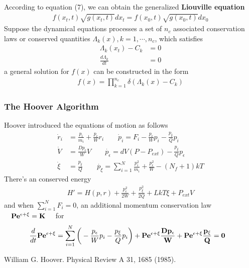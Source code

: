 \documentclass{beamer}
\begin{document}
\begin{frame}
\fontsize{9pt}{10pt}\selectfont
According to equation (7), we can obtain the generalized \textbf{Liouville equation}
\begin{align}
f(x_t,t)\sqrt{g(x_t,t)}dx_t=f(x_0,t)\sqrt{g(x_0,t)}dx_0
\end{align}
Suppose the dynamical equations processes a set of $n_c$ associated conservation laws or conserved quantities $\Lambda_k(x),k=1,\cdots,n_c$, which satisfies
\begin{align*}
\Lambda_k(x_t)-C_k&=0\\
\frac{d\Lambda_k}{dt}&=0
\end{align*}
a general solution for $f(x)$ can be constructed in the form
\begin{align}
f(x)=\prod^{n_c}_{k=1}\delta(\Lambda_k(x)-C_k)
\end{align}
\end{frame}
\begin{frame}
\frametitle{The Hoover Algorithm}
\fontsize{9pt}{10pt}\selectfont
Hoover introduced the equations of motion as follows
\begin{align}
\dot{r}_i&=\frac{p_i}{m_i}+\frac{p_{\epsilon}}{W}r_i\qquad 
\dot{p}_i=F_i-\frac{p_{\epsilon}}{W}p_i-\frac{p_{\xi}}{Q}p_i\nonumber\\
\dot{V}&=\frac{Dp_{\epsilon}}{W}V\qquad
\dot{p_{\epsilon}}=dV(P-P_{ext})-\frac{p_{\xi}}{Q}p_{\epsilon}\\
\dot{\xi}&=\frac{p_{\xi}}{Q}\qquad
\dot{p_{\xi}}=\sum^N_{i=1}\frac{p_i^2}{m_i}+\frac{p_{\epsilon}^2}{W}-(N_f+1)kT\nonumber
\end{align}
There's an conserved energy
\begin{align}
H'=H(p,r)+\frac{p_{\epsilon}^2}{2W}+\frac{p_{\xi}^2}{2Q}+LkT\xi+P_{ext}V
\end{align}
and when $\sum_{i=1}^NF_i=0$, an additional momentum conservation law $\quad \bf{P}e^{\epsilon+\xi}=K\quad$ for
\begin{align}
\frac{d}{dt}\bf{P}e^{\epsilon+\xi}&=\sum_{i=1}^N\bigg(-\frac{p_{\epsilon}}{W}p_i-\frac{p_{\xi}}{Q}p_i\bigg)+\bf{P}e^{\epsilon+\xi}\frac{Dp_{\epsilon}}{W}+\bf{P}e^{\epsilon+\xi}\frac{p_{\xi}}{Q}=0
\end{align}
\begin{thebibliography}{1}
\beamertemplatearticlebibitems
{} William G. Hoover. Physical Review A 31, 1685 (1985).
\end{thebibliography}
\end{frame}
\end{document}
